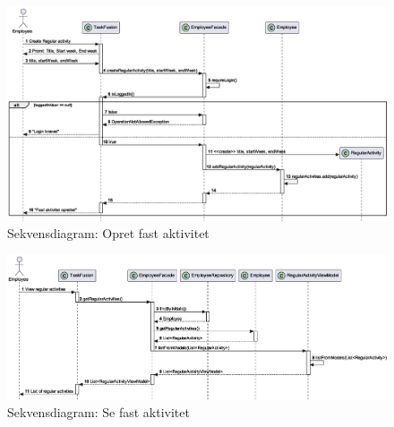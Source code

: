 \begin{figure}[H]
    \centering
    \caption{Sekvensdiagram: Opret fast aktivitet}\label{fig:sequenceCreateRegularActivity}
    \includegraphics[width=\textwidth]{RequirementsAndDesign/SequenceDiagrams/seqCreateRegularActivity.eps}
\end{figure}
\begin{figure}[H]
    \centering
    \caption{Sekvensdiagram: Se fast aktivitet}\label{fig:sequenceViewRegularActivity}
    \includegraphics[width=\textwidth]{RequirementsAndDesign/SequenceDiagrams/seqViewRegularActivity.eps}
\end{figure}

